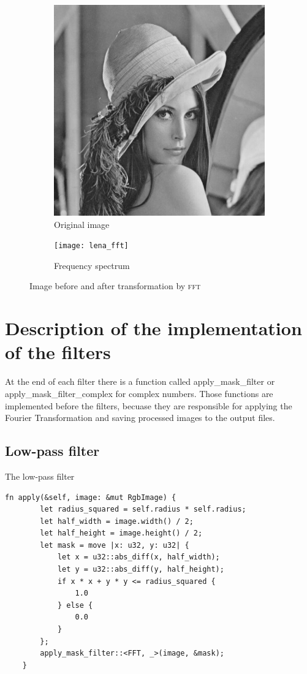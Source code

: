 \documentclass[12pt]{article}
\newcommand*{\fft}{\textsc{fft}}
\begin{document}
\begin{figure}[H]\centering
    \begin{subfigure}[ht]{.4\textwidth}\centering
        \includegraphics[width=\textwidth]{lena}
        \caption{Original image}
    \end{subfigure}
    \hspace*{2em}
    \begin{subfigure}[ht]{.4\textwidth}\centering
        \texttt{[image: lena\_fft]}
        \caption{Frequency spectrum}
    \end{subfigure}
    \caption{Image before and after transformation by \fft}
\end{figure}

\section{Description of the implementation of the filters}
At the end of each filter there is a function called apply_mask_filter or apply_mask_filter_complex for complex numbers. Those functions are implemented before the filters, becuase they are responsible for applying the Fourier Transformation and saving processed images to the output files.
\subsection{Low-pass filter}
The low-pass filter 
\begin{lstlisting}
fn apply(&self, image: &mut RgbImage) {
        let radius_squared = self.radius * self.radius;
        let half_width = image.width() / 2;
        let half_height = image.height() / 2;
        let mask = move |x: u32, y: u32| {
            let x = u32::abs_diff(x, half_width);
            let y = u32::abs_diff(y, half_height);
            if x * x + y * y <= radius_squared {
                1.0
            } else {
                0.0
            }
        };
        apply_mask_filter::<FFT, _>(image, &mask);
    }
\end{lstlisting}
\end{document}
